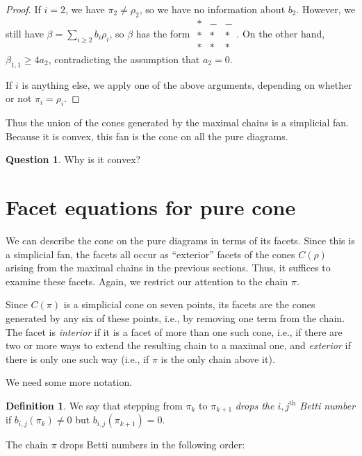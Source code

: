\documentclass[12pt]{amsart}
\theoremstyle{plain}
\theoremstyle{definition}
\newtheorem{question}[thm]{Question}
\newtheorem{definition}[thm]{Definition}
\theoremstyle{remark}
\begin{document}
\begin{proof}
If $i=2$, we have $\pi_{2}\neq \rho_{2}$, so we have no information
about $b_{2}$.  However, we still have $\beta=\sum_{i\geq
  2}b_{i}\rho_{i}$, so $\beta$ has the form
$\begin{array}{ccc}*&-&-\\*&*&*\\*&*&*\end{array}$.  On the other
hand, $\beta_{1,1}\geq 4a_{2}$, contradicting the assumption that
$a_{2}=0$.

If $i$ is anything else, we apply one of the above arguments,
depending on whether or not $\pi_{i}=\rho_{i}$.  
\end{proof}

Thus the union of the cones generated by the maximal chains is a
simplicial fan.  Because it is convex, this fan is the cone on all the
pure diagrams.

\begin{question}  Why is it convex?
\end{question}



\section{Facet equations for pure cone}


We can describe the cone on the pure diagrams in terms of its facets.
Since this is a simplicial fan, the facets all occur as ``exterior''
facets of the cones $C(\rho)$ arising from the maximal chains in the
previous sections.  Thus, it suffices to examine these facets.  Again,
we restrict our attention to the chain $\pi$.  

Since $C(\pi)$ is a simplicial cone on seven points, its facets are the
cones generated by any six of these points, i.e., by removing one
term from the chain.  The facet is \emph{interior} if it is a facet of
more than one such cone, i.e., if there are two or more ways to extend
the resulting chain to a maximal one, and \emph{exterior} if there is
only one such way (i.e., if $\pi$ is the only chain above it).  

We need some more notation.

\begin{definition}
We say that stepping from $\pi_k$ to $\pi_{k+1}$ \emph{drops the
  $i,j^{\mathrm{th}}$ Betti number} if $b_{i,j}(\pi_{k})\neq 0$ but
$b_{i,j}(\pi_{k+1})=0$.  
\end{definition}

The chain $\pi$ drops Betti numbers in the following order:
\end{document}
